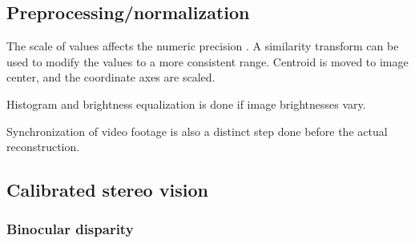 



\subsection{Preprocessing/normalization} %

The scale of values affects the numeric precision \cite{hartley1997defense,hartley03multiview}.
A similarity transform can be used to modify the values to a more consistent range.
Centroid is moved to image center, and the coordinate axes are scaled.


Histogram and brightness equalization is done if image brightnesses vary.

Synchronization of video footage is also a distinct step done before the actual reconstruction.




\subsection{Calibrated stereo vision} %

\subsubsection{Binocular disparity} \label{sec:binocular} %


